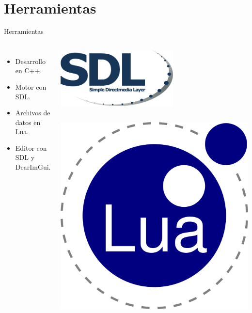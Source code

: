 \documentclass{beamer}
\begin{document}
\section{Herramientas}
\begin{frame}{Herramientas}
	\begin{columns}
		\begin{itemize}
			\item Desarrollo en C++.
			\item Motor con SDL.
			\item Archivos de datos en Lua.
			\item Editor con SDL y DearImGui.
		\end{itemize}
		\begin{center}
			\includegraphics[width=0.6\textwidth]{imgs/herramientas/sdl.pdf}
			\begin{columns}
				\includegraphics[width=\textwidth]{imgs/herramientas/lua.pdf}

\end{columns}
\end{center}
\end{columns}
\end{frame}
\end{document}
